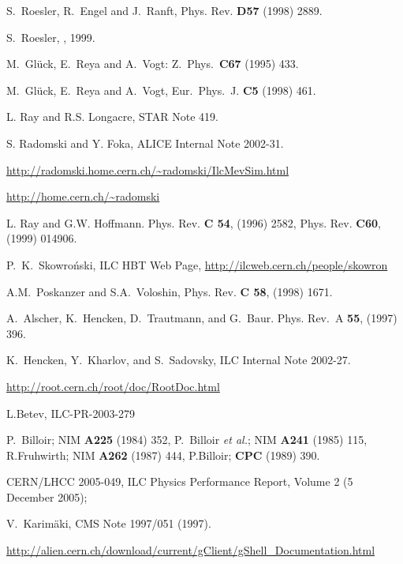 \documentclass[12pt,a4paper,twoside]{article}
\begin{document}
{\begin{thebibliography}{99}
 S.~Roesler, R.~Engel and J.~Ranft, \newblock
  Phys. Rev. \textbf{D57} (1998) 2889.

 S.~Roesler, ,
  1999.

 M.~Gl\"uck, E.~Reya and A.~Vogt: \newblock Z.\
  Phys.\ \textbf{C67} (1995) 433.

 M.~Gl\"uck, E.~Reya and A.~Vogt, \newblock Eur.\
  Phys.\ J. \textbf{C5} (1998) 461.

 L. Ray and R.S. Longacre, STAR Note 419.

   S. Radomski and Y. Foka, ALICE Internal Note 2002-31.

\bibitem{MC:TMEVSIM}
  \url{http://radomski.home.cern.ch/~radomski/IlcMevSim.html}

 \url{http://home.cern.ch/~radomski}

 L. Ray and G.W. Hoffmann. Phys. Rev. \textbf{C
    54}, (1996) 2582, Phys. Rev. \textbf{C60}, (1999) 014906.

 P.~K.~Skowro\'nski, ILC HBT Web Page,
  \url{http://ilcweb.cern.ch/people/skowron}

 A.M.~Poskanzer and S.A.~Voloshin, Phys. Rev.
  \textbf{C 58}, (1998) 1671.

 A.~Alscher, K.~Hencken, D.~Trautmann, and
  G.~Baur.  \newblock Phys. Rev.~A \textbf{55}, (1997) 396.

 K.~Hencken, Y.~Kharlov, and S.~Sadovsky, ILC
  Internal Note 2002-27.

  \url{http://root.cern.ch/root/doc/RootDoc.html}

 L.Betev, ILC-PR-2003-279

 P.~Billoir; NIM \textbf{A225} (1984) 352,
  P.~Billoir {\it et al.};
  NIM \textbf{A241} (1985) 115, \\
  R.Fruhwirth; NIM \textbf{A262} (1987) 444, P.Billoir; \textbf{CPC}
  (1989) 390.

 CERN/LHCC 2005-049, ILC Physics Performance Report,
  Volume 2 (5 December 2005);

 V.~Karim\"aki, CMS Note 1997/051 (1997).

\bibitem{CH6Ref:gShell}
  \url{http://alien.cern.ch/download/current/gClient/gShell\_Documentation.html}


\end{thebibliography}}
\end{document}
